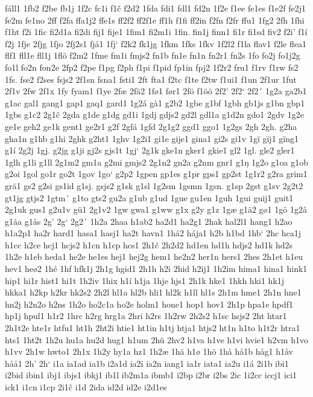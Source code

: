 fáll1
1fb2
f2be
fb1j
1f2c
fc1i
f1č
f2d2
1fda
fdi1
fdl1
fd2n
1f2e
f1ee
fe1es
f1e2f
fe2j1
fe2m
fe1no
2ff
f2fa
ffa1j2
ffe1s
ff2f2
ff2f1e
ff1h
f1fi
ff2in
f2fn
f2fr
ffu1
1fg2
2fh
1fhi
f1ht
f2i
1fic
fi2d1a
fi2di
fij1
fije1
1fim1
fi2m1i
1fin.
fin1j
finn1
fi1r
fi1sd
fiv2
f2i'
f1í
f2j
1fje
2fjg
1fjo
2fj2s1
fjå1
1fj`
f2k2
fk1jg
1fkm
1fks
1fkv
1f2l2
f1la
flav1
f2le
flea1
flf1
fll1e
fll1j
1flö
f2m2
1fme
fm1i
fmjs2
fn1b
fn1e
fn1n
fn2r1
fn2s
1fo
fo2j
fo1j2g
fo1l
fo2n
fon2e
2fp2
f2pe
f1pg
f2ph
f1pi
f1pid
fp1in
fpj2
1f2r2
fru1
f1rv
f1rw
fs2
1fs.
fse2
f2ses
fsjs2
2f1sn
fsna1
fsti1
2ft
fta1
f2tc
f1te
f2tw
f1ui1
f1un
2f1ur
1fut
2f1v
2fw
2f1x
1fy
fyam1
f1ye
2fæ
2fä2
1fø1
før1
2fö
f1öö
2f2'
2f2`
2f2´
1g2a
ga2b1
g1ac
gal1
gang1
gap1
gaq1
gard1
1g2á
gà1
g2b2
1gbe
g1bf
1gbh
gb1js
g1bn
gbp1
1gbs
g1c2
2g1č
2gda
g1de
g1dg
gd1i
1gdj
gdjs2
gd2l
gdl1a
g1d2n
gdo1
2gdv
1g2e
ge1e
geh2
ge1k
gent1
ge2r1
g2f
2gfá
1gfd
2g1g2
ggd1
ggo1
1g2gs
2gh
2gh.
g2ha
gha1n
g1hb
g1hi
2ghk
g2ht1
1ghv
1g2i1
gi1e
gije1
gina1
gi2s
gi1v
1gï
gïj1
gïng1
g1í
2g2j
1gj.
g2jg
g1ji
gj2s
gjs1t
1gj`
2g1k
gke1n
gker1
gkie1
gl2
1gl.
gle2
gler1
1glh
g1li
g1ll
2g1m2
gm1a
g2mi
gmjs2
2g1n2
gn2a
g2nm
gnr1
g1ŋ
1g2o
g1oa
g1ob
g2oi
1gol
go1r
go2t
1gov
1go`
g2p2
1gpen
gp1es
g1pr
gps1
gp2st
1g1r2
g2ra
grim1
grä1
gs2
g2si
gs1id
g1sj.
gsjs2
g1sk
g1sl
1g2sm
1gsmn
1gsn.
g1sp
2gst
g1sv
2g2t2
gt1jg
gtjs2
1gtm´
g1to
gts2
gu2a
g1ub
g1ud
1gue
gu1en
1guh
1gui
guij1
guit1
2g1uk
gus1
g2u1v
gü1
2g1v2
1gw
gwa1
g1ww
g1x
g2y
g1z
1gæ
g1ä2
gø1
1gö
1g2å
g1åa
g1ås
2g'
2g`
2g2´
1h2a
2haa
h1ab2
ha2d1
ha2g1
2hak
hal2l1
hang1
h2ao
h1a2p1
ha2r
hard1
hasa1
hasj1
ha2t
havn1
1há2
hája1
h2b
h1bd
1hb`
2hc
hca1j
h1cc
h2ce
hcj1
hcjs2
h1cn
h1cp
hcs1
2h1č
2h2d2
hd1en
hd1h
hdjs2
hd1k
hd2s
1h2e
h1eb
heda1
he2e
he1es
hej1
hej2g
hem1
he2n2
her1n
hers1
2hes
2h1et
h1eu
hev1
heø2
1hé
1hf
hfk1j
2h1g
hgid1
2h1h
h2i
2hid
h2ij1
1h2im
hima1
hina1
hink1
hip1
hi1r
hist1
hi1t
1h2iv
1hix
h1í
h1ja
1hje
hjs1
2h1k
hke1
1hkh
hki1
hk1j
hkka1
h2kp
h2kr
hk2s2
2h2l
hl1a
hl2b
hli1
hl2k
h1ll
hl1s
2h1m
hme1
2h1n
hne1
hn2j
h2n2o
h2ns
1h2o
ho2c1a
ho2e
holm1
hone1
hop1
hov1
2h1p
hpa1e
hpdf1
hp1j
hpul1
h1r2
1hrc
h2rg
hrg1a
2hri
h2rs
1h2rw
2h2s2
h1sc
hsjs2
2ht
htar1
2h1t2e
hte1r
htfu1
ht1h
2ht2i
htie1
ht1in
h1tj
htja1
htjs2
ht1n
h1to
h1t2r
htra1
hts1
1ht2t
1h2u
hu1a
hu2d
hug1
h1um
2hü
2hv2
h1va
h1ve
h1vi
hvie1
h2vm
h1vo
h1vv
2h1w
hwto1
2h1x
1h2y
hy1a
hz1
1h2æ
1hä
h1ø
1hö
1hå
hå1b
håg1
h1åv
håå1
2h'
2h`
i1a
ia1ad
ia1b
i2a1d
ia2i
ia2n
iang1
ia1r
iata1
ia2u
i1á
2i1b
ibi1
i2bid
ibin1
ibj1
ibjs1
ibkj1
ib1l
ib2m1a
ibmb1
i2bp
i2br
i2bs
2ic
1i2cc
iccj1
ici1
ick1
i1cn
i1cp
2i1č
i1d
2ida
id2d
id2e
i2d1es
